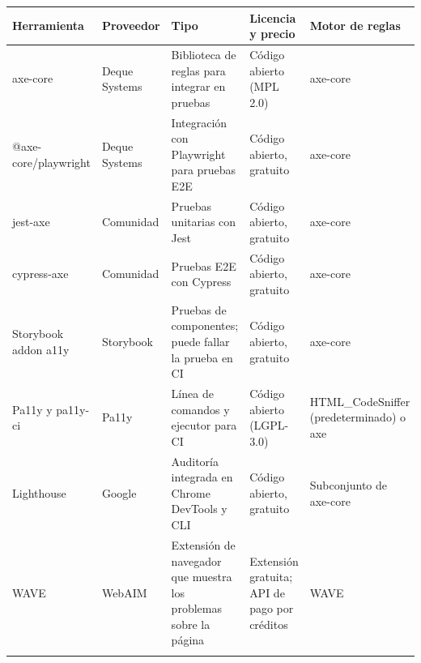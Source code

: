 \documentclass[10pt,letterpaper,onecolumn]{IEEEtran}
\newcommand{\filafina}{\arrayrulecolor{black!30}\specialrule{0.3pt}{1.5pt}{1.5pt}\arrayrulecolor{black}}
\begin{document}
\begin{longtable}[]{@{}
  >{\raggedright\arraybackslash}p{0.2000\dimexpr\linewidth-8\tabcolsep\relax}
  >{\raggedright\arraybackslash}p{0.2000\dimexpr\linewidth-8\tabcolsep\relax}
  >{\raggedright\arraybackslash}p{0.2533\dimexpr\linewidth-8\tabcolsep\relax}
  >{\raggedright\arraybackslash}p{0.1467\dimexpr\linewidth-8\tabcolsep\relax}
  >{\raggedright\arraybackslash}p{0.2000\dimexpr\linewidth-8\tabcolsep\relax}@{}}
\toprule\noalign{}
\begin{minipage}[b]{\linewidth}\raggedright
Herramienta
\end{minipage} & \begin{minipage}[b]{\linewidth}\raggedright
Proveedor
\end{minipage} & \begin{minipage}[b]{\linewidth}\raggedright
Tipo
\end{minipage} & \begin{minipage}[b]{\linewidth}\raggedright
Licencia y precio
\end{minipage} & \begin{minipage}[b]{\linewidth}\raggedright
Motor de reglas
\end{minipage} \\
\midrule\noalign{}
\endhead
\bottomrule\noalign{}
\endlastfoot
axe-core & Deque Systems & Biblioteca de reglas para integrar en pruebas & Código abierto (MPL 2.0) & axe-core \\ \filafina
@axe-core/playwright & Deque Systems & Integración con Playwright para pruebas E2E & Código abierto, gratuito & axe-core \\ \filafina
jest-axe & Comunidad & Pruebas unitarias con Jest & Código abierto, gratuito & axe-core \\ \filafina
cypress-axe & Comunidad & Pruebas E2E con Cypress & Código abierto, gratuito & axe-core \\ \filafina
Storybook addon a11y & Storybook & Pruebas de componentes; puede fallar la prueba en CI & Código abierto, gratuito & axe-core \\ \filafina
Pa11y y pa11y-ci & Pa11y & Línea de comandos y ejecutor para CI & Código abierto (LGPL-3.0) & HTML\_CodeSniffer (predeterminado) o axe \\ \filafina
Lighthouse & Google & Auditoría integrada en Chrome DevTools y CLI & Código abierto, gratuito & Subconjunto de axe-core \\ \filafina
WAVE & WebAIM & Extensión de navegador que muestra los problemas sobre la página & Extensión gratuita; API de pago por créditos & WAVE \\ \filafina

\end{longtable}
\end{document}
